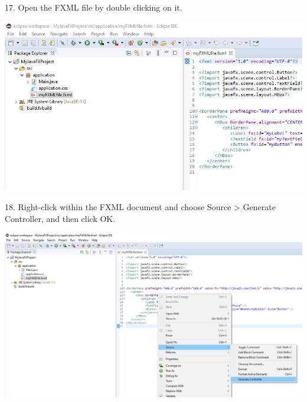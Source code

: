 \documentclass{beamer}
\begin{document}
\begin{frame}
17. Open the FXML file by double clicking on it.
        \begin{center}
            \includegraphics[scale=.4]{open_fxml.jpg}
        \end{center}

\end{frame}

\begin{frame}
18. Right-click within the FXML document and choose Source > Generate Controller, and then click OK.

        \begin{center}
            \includegraphics[scale=.2]{generate_controller.jpg}
        \end{center}
\end{frame}
\end{document}
